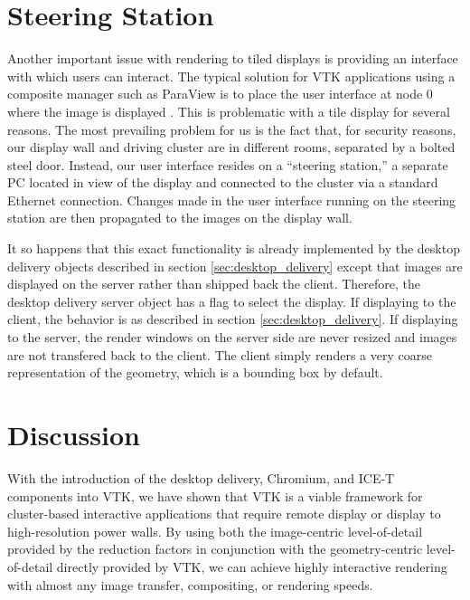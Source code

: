 \documentclass[twocolumn]{article}
\newcommand{\sticky}[1]{}
\begin{document}
  \section{Steering Station}
  \label{sec:steering_station}

  Another important issue with rendering to tiled displays is providing an
  interface with which users can interact.  The typical solution for VTK
  applications using a composite manager such as ParaView is to place the
  user interface at node 0 where the image is displayed \cite{Law01}.  This
  is problematic with a tile display for several reasons.  The most
  prevailing problem for us is the fact that, for security reasons, our
  display wall and driving cluster are in different rooms, separated by a
  bolted steel door.  Instead, our user interface resides on a ``steering
  station,'' a separate PC located in view of the display and connected to
  the cluster via a standard Ethernet connection.  Changes made in the user
  interface running on the steering station are then propagated to the
  images on the display wall.

  It so happens that this exact functionality is already implemented by the
  desktop delivery objects described in section \ref{sec:desktop_delivery}
  except that images are displayed on the server rather than shipped back
  the client.  Therefore, the desktop delivery server object has a flag to
  select the display.  If displaying to the client, the behavior is as
  described in section \ref{sec:desktop_delivery}.  If displaying to the
  server, the render windows on the server side are never resized and
  images are not transfered back to the client.  The client simply renders
  a very coarse representation of the geometry, which is a bounding box by
  default.


  \section{Discussion}
  \label{sec:discussion}

  With the introduction of the desktop delivery, Chromium, and ICE-T
  components into VTK, we have shown that VTK is a viable framework for
  cluster-based interactive applications that require remote display or
  display to high-resolution power walls.  By using both the image-centric
  level-of-detail provided by the reduction factors in conjunction with the
  geometry-centric level-of-detail directly provided by VTK, we can achieve
  highly interactive rendering with almost any image transfer, compositing,
  or rendering speeds.  \sticky{Some empirical evidence, i.e. with LLNL
  data, would probably be good here.  But how?  You really need a video and
  see it in action.}
\end{document}
